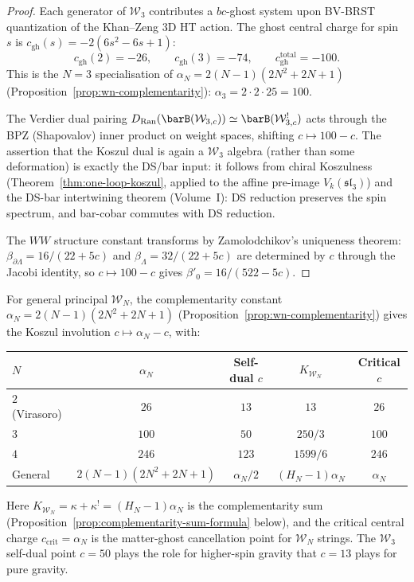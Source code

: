 \begin{proof}
Each generator of $\mathcal{W}_3$ contributes a $bc$-ghost system
upon BV-BRST quantization of the Khan--Zeng 3D HT action.
The ghost central charge for spin~$s$ is
$c_{\mathrm{gh}}(s) = -2(6s^2 - 6s + 1)$:
\[
c_{\mathrm{gh}}(2) = -26, \qquad
c_{\mathrm{gh}}(3) = -74, \qquad
c_{\mathrm{gh}}^{\mathrm{total}} = -100.
\]
This is the $N = 3$ specialisation of
$\alpha_N = 2(N{-}1)(2N^2{+}2N{+}1)$
(Proposition~\ref{prop:wn-complementarity}):
$\alpha_3 = 2 \cdot 2 \cdot 25 = 100$.

The Verdier dual pairing $D_{\mathrm{Ran}}(\barB(\mathcal{W}_{3,c}))
\simeq \barB(\mathcal{W}_{3,c}^!)$ acts through the BPZ
(Shapovalov) inner product on weight spaces, shifting $c \mapsto 100 - c$.
The assertion that the Koszul dual is again a $\mathcal{W}_3$ algebra
(rather than some deformation) is exactly the DS/bar input:
it follows from chiral Koszulness
(Theorem~\ref{thm:one-loop-koszul}, applied to the affine
pre-image $V_k(\mathfrak{sl}_3)$) and the DS-bar intertwining
theorem (Volume~I): DS reduction preserves the spin spectrum,
and bar-cobar commutes with DS reduction.

The $WW$ structure constant transforms by Zamolodchikov's
uniqueness theorem: $\beta_{\partial\Lambda}=16/(22+5c)$ and
$\beta_{\Lambda}=32/(22+5c)$ are determined by $c$ through the
Jacobi identity, so $c \mapsto 100 - c$ gives
$\beta'_0 = 16/(522 - 5c)$.
\end{proof}

\begin{remark}
\label{rem:wn-koszul-involution}
%
For general principal $\mathcal{W}_N$, the complementarity constant
$\alpha_N = 2(N{-}1)(2N^2{+}2N{+}1)$
(Proposition~\ref{prop:wn-complementarity}) gives
the Koszul involution $c \mapsto \alpha_N - c$, with:
\begin{center}
\renewcommand{\arraystretch}{1.2}
\begin{tabular}{lcccc}
\toprule
$N$ & $\alpha_N$ & Self-dual $c$ & $K_{\mathcal{W}_N}$ & Critical $c$ \\
\midrule
$2$ (Virasoro) & $26$ & $13$ & $13$ & $26$ \\
$3$ & $100$ & $50$ & $250/3$ & $100$ \\
$4$ & $246$ & $123$ & $1599/6$ & $246$ \\
General & $2(N{-}1)(2N^2{+}2N{+}1)$ & $\alpha_N/2$ & $(H_N{-}1)\alpha_N$ & $\alpha_N$ \\
\bottomrule
\end{tabular}
\end{center}
Here $K_{\mathcal{W}_N} = \kappa + \kappa^! = (H_N - 1)\alpha_N$
is the complementarity sum
(Proposition~\ref{prop:complementarity-sum-formula} below),
and the critical central charge $c_{\mathrm{crit}} = \alpha_N$
is the matter-ghost cancellation point for $\mathcal{W}_N$ strings.
The $\mathcal{W}_3$ self-dual point $c = 50$ plays the role for
higher-spin gravity that $c = 13$ plays for pure gravity.
\end{remark}

